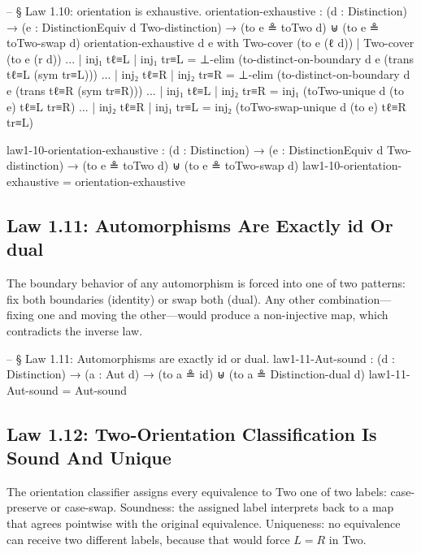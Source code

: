 \documentclass[11pt,a4paper]{book}
\def\texttt#1{#1}%
\begin{document}
\begin{code}
-- § Law 1.10: orientation is exhaustive.
orientation-exhaustive :
  (d : Distinction) →
  (e : DistinctionEquiv d Two-distinction) →
  (to e ≗ toTwo d) ⊎ (to e ≗ toTwo-swap d)
orientation-exhaustive d e with Two-cover (to e (ℓ d)) | Two-cover (to e (r d))
... | inj₁ tℓ≡L | inj₁ tr≡L = ⊥-elim (to-distinct-on-boundary d e (trans tℓ≡L (sym tr≡L)))
... | inj₂ tℓ≡R | inj₂ tr≡R = ⊥-elim (to-distinct-on-boundary d e (trans tℓ≡R (sym tr≡R)))
... | inj₁ tℓ≡L | inj₂ tr≡R = inj₁ (toTwo-unique d (to e) tℓ≡L tr≡R)
... | inj₂ tℓ≡R | inj₁ tr≡L = inj₂ (toTwo-swap-unique d (to e) tℓ≡R tr≡L)

law1-10-orientation-exhaustive :
  (d : Distinction) →
  (e : DistinctionEquiv d Two-distinction) →
  (to e ≗ toTwo d) ⊎ (to e ≗ toTwo-swap d)
law1-10-orientation-exhaustive = orientation-exhaustive
\end{code}

\subsection{Law 1.11: Automorphisms Are Exactly id Or dual}

The boundary behavior of any automorphism is forced into one of two patterns: fix both boundaries (identity) or swap both (dual). Any other combination—fixing one and moving the other—would produce a non-injective map, which contradicts the inverse law.

\begin{code}
-- § Law 1.11: Automorphisms are exactly id or dual.
law1-11-Aut-sound :
  (d : Distinction) →
  (a : Aut d) →
  (to a ≗ id) ⊎ (to a ≗ Distinction-dual d)
law1-11-Aut-sound = Aut-sound
\end{code}

\subsection{Law 1.12: Two-Orientation Classification Is Sound And Unique}

The orientation classifier assigns every equivalence to \texttt{Two} one of two labels: \texttt{case-preserve} or \texttt{case-swap}. Soundness: the assigned label interprets back to a map that agrees pointwise with the original equivalence. Uniqueness: no equivalence can receive two different labels, because that would force $L = R$ in \texttt{Two}.
\end{document}
